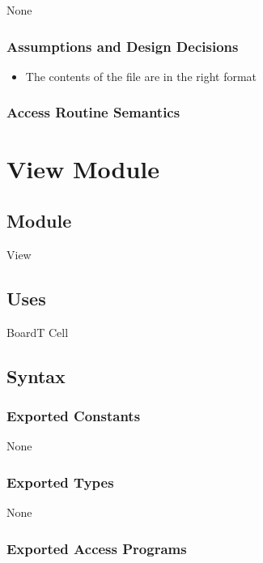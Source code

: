 \documentclass[12pt]{article}
\begin{document}
None

\subsubsection* {Assumptions and Design Decisions}

\begin{itemize}
    \item The contents of the file are in the right format
\end{itemize}

\subsubsection* {Access Routine Semantics}

\newpage

\section* {View Module}

\subsection*{Module}

View

\subsection* {Uses}

BoardT
Cell

\subsection* {Syntax}

\subsubsection* {Exported Constants}

None

\subsubsection* {Exported Types}

None

\subsubsection* {Exported Access Programs}
\end{document}
